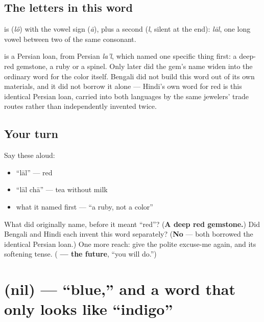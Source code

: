 \subsection*{The letters in this word}
\textbf{} is \textbf{} (\emph{lô}) with the vowel sign \textbf{} (\emph{ā}), plus a second \textbf{} (\emph{l}, silent at the end): \emph{lāl}, one long vowel between two of the same consonant.

\begin{cousinweb}
\textbf{} is a Persian loan, from Persian \emph{la'l}, which named one specific thing first: a deep-red gemstone, a ruby or a spinel. Only later did the gem's name widen into the ordinary word for the color itself. Bengali did not build this word out of its own materials, and it did not borrow it alone — Hindi's own word for red is this identical Persian loan, carried into both languages by the same jewelers' trade routes rather than independently invented twice.
\end{cousinweb}

\subsection*{Your turn}
Say these aloud:

\begin{itemize}
\raggedright
  \item \textquotedblleft{}lāl\textquotedblright{} — red
  \item \textquotedblleft{}lāl chā\textquotedblright{} — tea without milk
  \item what it named first — \textquotedblleft{}a ruby, not a color\textquotedblright{}
\end{itemize}

\begin{tcolorbox}[breakable,colback=teal!4,colframe=teal!35!black,title={Before you move on}]
What did  originally name, before it meant \textquotedblleft{}red\textquotedblright{}? (\textbf{A deep red gemstone.}) Did Bengali and Hindi each invent this word separately? (\textbf{No} — both borrowed the identical Persian loan.) One more reach: give the polite excuse-me again, and its softening tense. (\textbf{  — the future}, \textquotedblleft{}you will do.\textquotedblright{})
\end{tcolorbox}
\section[nil]{ (nil) — \textquotedblleft{}blue,\textquotedblright{} and a word that only looks like \textquotedblleft{}indigo\textquotedblright{}}

